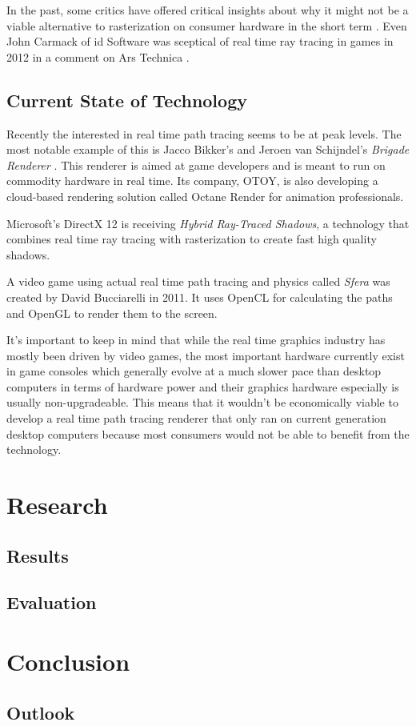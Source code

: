 \documentclass[
  twoside,
  11pt, a4paper,
  footinclude=true,
  headinclude=true,
  cleardoublepage=empty
]{scrreprt}
\begin{document}
In the past, some critics have offered critical insights about why it might not be a viable
alternative to rasterization on consumer hardware in the short term
\cite{site:raytracing-vs-rasterization} \cite{site:codinghorror-raytracing}. Even John Carmack of
id Software was sceptical of real time ray tracing in games in 2012 in a comment on Ars Technica
\cite{site:carmack-scepticism}.

\section{Current State of Technology}
Recently the interested in real time path tracing seems to be at peak levels. The most notable
example of this is Jacco Bikker's and Jeroen van Schijndel's \emph{Brigade Renderer} \cite{article:brigade}
\cite{site:brigade}. This renderer is aimed at game developers and is meant to run on commodity
hardware in real time. Its company, OTOY, is also developing a cloud-based rendering solution
called Octane Render \cite{site:octane} for animation professionals.

Microsoft's DirectX 12 \cite{site:dx12-raytracing} is receiving \emph{Hybrid Ray-Traced Shadows}, a
technology that combines real time ray tracing with rasterization to create fast high quality
shadows.

A video game using actual real time path tracing and physics called \emph{Sfera} was created by
David Bucciarelli \cite{site:sfera} in 2011. It uses OpenCL for calculating the paths and OpenGL to
render them to the screen.

It's important to keep in mind that while the real time graphics industry has mostly been driven by
video games, the most important hardware currently exist in game consoles which generally evolve at
a much slower pace than desktop computers in terms of hardware power and their graphics hardware
especially is usually non-upgradeable. This means that it wouldn't be economically viable to
develop a real time path tracing renderer that only ran on current generation desktop computers
because most consumers would not be able to benefit from the technology.

\chapter{Research}
\lipsum[1]

\section{Results}
\lipsum[1]

\section{Evaluation}
\lipsum[1]

\chapter{Conclusion}
\lipsum[1]

\section{Outlook}
\lipsum[1]

\listoffigures
 
\listoftables



    
\end{document}

